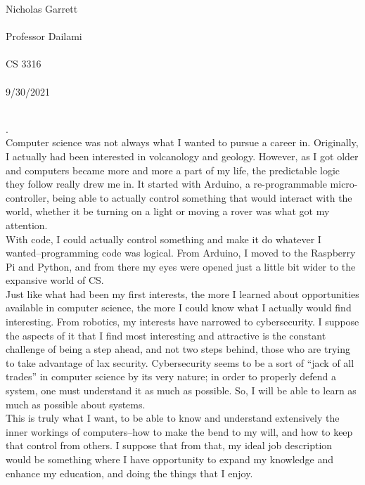 \documentclass[12pt, a4paper]{article}
\begin{document}
\noindent
Nicholas Garrett\\ \\
Professor Dailami\\ \\
CS 3316\\ \\
9/30/2021\\ \\


\begin{center}
\end{center}

.\\
Computer science was not always what I wanted to pursue a career in.  Originally, I actually had been interested in volcanology and geology.  However, as I got older and computers became more and more a part of my life, the predictable logic they follow really drew me in.  It started with Arduino, a re-programmable micro-controller, being able to actually control something that would interact with the world, whether it be turning on a light or moving a rover was what got my attention. \\

 With code, I could actually control something and make it do whatever I wanted--programming code was logical.  From Arduino, I moved to the Raspberry Pi and Python, and from there my eyes were opened just a little bit wider to the expansive world of CS. \\

Just like what had been my first interests, the more I learned about opportunities available in computer science, the more I could know what I actually would find interesting.  From robotics, my interests have narrowed to cybersecurity.  I suppose the aspects of it that I find most interesting and attractive is the constant challenge of being a step ahead, and not two steps behind, those who are trying to take advantage of lax security.  Cybersecurity seems to be a sort of ``jack of all trades'' in computer science by its very nature; in order to properly defend a system, one must understand it as much as possible.  So, I will be able to learn as much as possible about systems.  \\

This is truly what I want, to be able to know and understand extensively the inner workings of computers--how to make the bend to my will, and how to keep that control from others.  I suppose that from that, my ideal job description would be something where I have opportunity to expand my knowledge and enhance my education, and doing the things that I enjoy. \\ \\ \\
\end{document}
